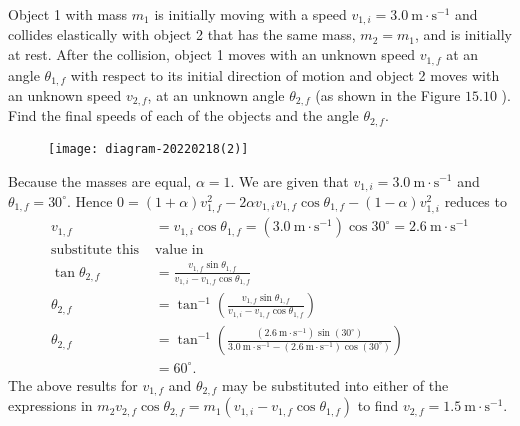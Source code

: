 \begin{exercise}
	Object 1 with mass $m_{1}$ is initially moving with a speed $v_{1, i}=3.0 \mathrm{~m} \cdot \mathrm{s}^{-1}$ and collides elastically with object 2 that has the same mass, $m_{2}=m_{1}$, and is initially at rest. After the collision, object 1 moves with an unknown speed $v_{1, f}$ at an angle $\theta_{1, f}$ with respect to its initial direction of motion and object 2 moves with an unknown speed $v_{2, f}$, at an unknown angle $\theta_{2, f}$ (as shown in the Figure $15.10$ ). Find the final speeds of each of the objects and the angle $\theta_{2, f}$.\\
	\begin{figure}[H]
		\centering
		\texttt{[image: diagram-20220218(2)]}
	\end{figure}
\end{exercise}
\begin{answer}
	 Because the masses are equal, $\alpha=1$. We are given that $v_{1, i}=3.0 \mathrm{~m} \cdot \mathrm{s}^{-1}$ and $\theta_{1, f}=30^{\circ}$. Hence  $0=(1+\alpha) v_{1, f}^{2}-2 \alpha v_{1, i} v_{1, f} \cos \theta_{1, f}-(1-\alpha) v_{1, i}^{2}$ reduces  to
	\begin{align*}
	 v_{1, f}&=v_{1, i} \cos \theta_{1, f}=\left(3.0 \mathrm{~m} \cdot \mathrm{s}^{-1}\right) \cos 30^{\circ}=2.6 \mathrm{~m} \cdot \mathrm{s}^{-1} \\
	\text{substitute this }&\text{value in }\\
	\tan \theta_{2, f}&=\frac{v_{1, f} \sin \theta_{1, f}}{v_{1, i}-v_{1, f} \cos \theta_{1, f}}\\
	\theta_{2, f} &=\tan ^{-1}\left(\frac{v_{1, f} \sin \theta_{1, f}}{v_{1, i}-v_{1, f} \cos \theta_{1, f}}\right) \\
	\theta_{2, f} &=\tan ^{-1}\left(\frac{\left(2.6 \mathrm{~m} \cdot \mathrm{s}^{-1}\right) \sin \left(30^{\circ}\right)}{3.0 \mathrm{~m} \cdot \mathrm{s}^{-1}-\left(2.6 \mathrm{~m} \cdot \mathrm{s}^{-1}\right) \cos \left(30^{\circ}\right)}\right) \\
	&=60^{\circ} .
	\end{align*}
	The above results for $v_{1, f}$ and $\theta_{2, f}$ may be substituted into either of the expressions in $m_{2} v_{2, f} \cos \theta_{2, f}=m_{1}\left(v_{1, i}-v_{1, f} \cos \theta_{1, f}\right)$  to find $v_{2, f}=1.5 \mathrm{~m} \cdot \mathrm{s}^{-1}$. 
\end{answer}
